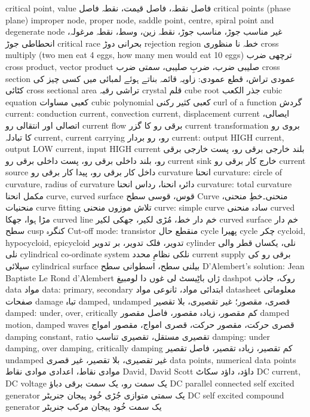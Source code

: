 critical point, value	فاصل نقطہ، فاصل قیمت، نقطہ فاصل
critical points (phase plane) improper node, proper node, saddle point, centre, spiral point and degenerate node	غیر مناسب جوڑ، مناسب جوڑ، نقطہ زین، وسط، نقطہ مرغولہ، انحطاطی جوڑ
critical race	بحرانی دوڑ
rejection region	خطہ نا منظوری
cross multiply (two men eat 4 eggs, how many men would eat 10 eggs)	ترچھی ضرب
cross product, vector product	صلیبی ضرب، ضربِ صلیبی، سمتی ضرب
cross section	عمودی تراش، قطع عمودی: زاویہ قائمہ بناتے ہوئے لمبائی میں کسی چیز کی کٹائی
cross sectional area	تراشی رقبہ
crystal	قلم
cube root	جذر الکعب
cubic equation	کعبی مساوات
cubic polynomial	کعبی کثیر رکنی
curl of a function	گردش
current: conduction current, convection current, displacement current	ایصالی، اتصالی اور انتقالی رو
current flow	برقی رو کا گزر
current transformation	بروی رو کا تبادلہ
current, current carrying	رو، رو بردار
current: output HIGH current, output LOW current, input HIGH current	بلند خارجی برقی رو، پست خارجی برقی رو، بلند داخلی برقی رو، پست داخلی برقی رو
current sink	خارج کار برقی رو
current source	داخل کار برقی رو، پیدا کار برقی رو
curvature	انحنا
curvature: circle of curvature, radius of curvature	دائرہ انحنا، رداس انحنا
curvature: total curvature	مکمل انحنا
curve, curved surface	قوس، قوسی سطح
Curve	منحنی۔خطِ منحنی، منحنیات
curve fitting	تلاش موزوں منحنی
curve: simple curve	سادہ منحنی
curved   	مڑا ہوا، جھکا
curved line	خم دار خط، مُڑی لکیر، جھکی لکیر
curved surface	خم دار سطح
cusp	کنگرہ
Cut-off mode: transistor	منقطع حال
cycle	پھیرا
cycle	چکر
cycloid, hypocycloid, epicycloid	تدویر، فلک تدویر، بر تدویر
cylinder	نلی، یکساں قطر والی نلی
cylindrical co-ordinate system	نلکی نظامِ محدد
current supply	برقی رو کی سپلائی
cylindrical surface	بیلنی سطح، اسطوانی سطح
D'Alembert's solution: Jean Baptiste Le Rond d'Alembert	ژاں باٹِیسٹ لی غوں دا لومبیغ
dashpot	روک، جاذب
data	مواد
data: primary, secondary	ابتدائی مواد، ثانوعی مواد
datasheet	معلوماتی صفحات
damage	تباہ
damped, undamped	قصری، مقصور؛ غیر تقصیری، بلا تقصیر
damped: under, over, critically	کم مقصور، زیادہ مقصور، فاصل مقصور
damped motion, damped waves	قصری حرکت، مقصور حرکت، قصری امواج، مقصور امواج
damping constant, ratio	تقصیری مستقل، تقصیری تناسب
damping: under damping, over damping, critically damping	کم تقصیر، زیادہ تقصیر، فاصل تقصیر
undamped	غیر تقصیری، بلا تقصیر، غیر قصری
data points, numerical data points	موادی نقاط، اعدادی  موادی نقاط
David, David Scott	داؤد، داؤد سکاٹ
DC current, DC voltage	یک سمت رو، یک سمت برقی دباؤ
DC parallel connected self excited generator	یک سمتی متوازی جُڑی خُود ہیجان جنریٹر
DC self excited compound generator	یک سمت خُود ہیجان مرکب جنریٹر
